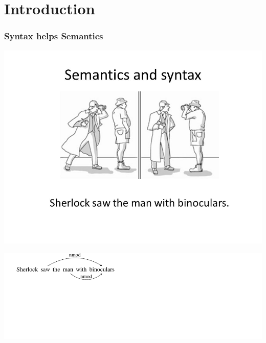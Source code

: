 \documentclass[mathserif,12pt]{beamer}
\begin{document}
\section{Introduction}

\begin{frame}
\frametitle{Syntax helps Semantics}
\centering
\includegraphics[trim=15em 18em 14em 12em,clip=true,scale=0.5]{figures/prep-ambiguity}

\vspace{2em}
\includegraphics[trim=1em 9em 21em 0em,clip=true,scale=1.2]{figures/pp-ambiguity}
\end{frame}
\end{document}
